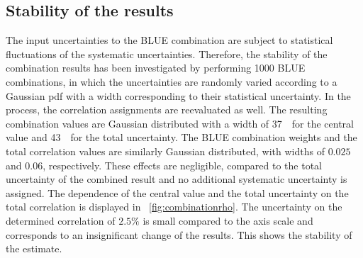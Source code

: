 \subsection{Stability of the results}
\label{sec:stabtests}
%
The input uncertainties to the \gls{BLUE} combination are subject to statistical fluctuations of the systematic uncertainties. Therefore, the stability of the combination results has been investigated by performing 1000 \gls{BLUE} combinations, in which the uncertainties are randomly varied according to a Gaussian \gls{pdf} with a width corresponding to their statistical uncertainty. 
%
In the process, the correlation assignments are reevaluated as well. 
%
The resulting combination values are Gaussian distributed with a width of 37~\MeV\ for the central value and 43~\MeV\ for the total uncertainty. 
%
The \gls{BLUE} combination weights and the total correlation values are similarly Gaussian distributed, with widths of $0.025$ and $0.06$, respectively.
%
These effects are negligible, compared to the total uncertainty of the combined result and no additional systematic uncertainty is assigned. 
%
The dependence of the central value and the total uncertainty on the total correlation is displayed in \fig~\ref{fig:combinationrho}. The uncertainty on the determined correlation of $2.5\%$ is small compared to the axis scale and corresponds to an insignificant change of the results. This shows the stability of the estimate. 







